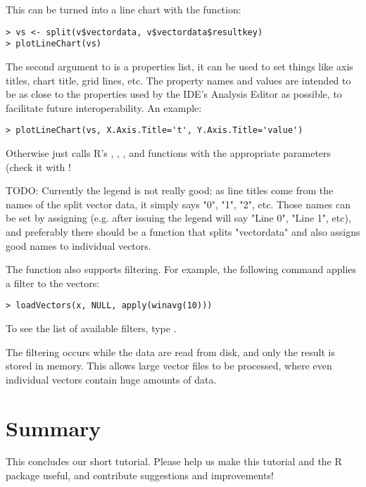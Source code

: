 This can be turned into a line chart with the  function:

\begin{verbatim}
> vs <- split(v$vectordata, v$vectordata$resultkey)
> plotLineChart(vs)
\end{verbatim}

The second argument to  is a properties list, it can be used
to set things like axis titles, chart title, grid lines, etc. The property names and 
values are intended to be as close to the properties used by the IDE's Analysis Editor 
as possible, to facilitate future interoperability. An example:

\begin{verbatim}
> plotLineChart(vs, X.Axis.Title='t', Y.Axis.Title='value')
\end{verbatim}

Otherwise  just calls R's , , 
,  and  functions with the appropriate parameters
(check it with !

TODO: Currently the legend is not really good: as line titles come from the names of
the split vector data, it simply says "0", "1", "2", etc. Those names can be set 
by assigning  (e.g. after issuing 
the legend will say "Line 0", "Line 1", etc), and preferably there should be a function
that splits "vectordata" and also assigns good names to individual vectors.

The  function also supports filtering. For example, the following
command applies a  filter to the vectors:

\begin{verbatim}
> loadVectors(x, NULL, apply(winavg(10)))
\end{verbatim}

To see the list of available filters, type .

The filtering occurs while the data are read from disk, and only the result is 
stored in memory. This allows large vector files to be processed, where even individual 
vectors contain huge amounts of data.


\section{Summary}

This concludes our short tutorial. Please help us make this tutorial and the R package useful,
and contribute suggestions and improvements!



